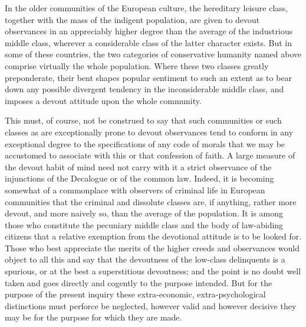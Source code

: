 \documentclass[12pt]{report}
\begin{document}
In the older communities of the European culture, the hereditary leisure
class, together with the mass of the indigent population, are given to
devout observances in an appreciably higher degree than the average
of the industrious middle class, wherever a considerable class of
the latter character exists. But in some of these countries, the two
categories of conservative humanity named above comprise virtually the
whole population. Where these two classes greatly preponderate, their
bent shapes popular sentiment to such an extent as to bear down any
possible divergent tendency in the inconsiderable middle class, and
imposes a devout attitude upon the whole community.

This must, of course, not be construed to say that such communities or
such classes as are exceptionally prone to devout observances tend to
conform in any exceptional degree to the specifications of any code
of morals that we may be accustomed to associate with this or that
confession of faith. A large measure of the devout habit of mind
need not carry with it a strict observance of the injunctions of the
Decalogue or of the common law. Indeed, it is becoming somewhat of a
commonplace with observers of criminal life in European communities that
the criminal and dissolute classes are, if anything, rather more devout,
and more naively so, than the average of the population. It is among
those who constitute the pecuniary middle class and the body of
law-abiding citizens that a relative exemption from the devotional
attitude is to be looked for. Those who best appreciate the merits of
the higher creeds and observances would object to all this and say that
the devoutness of the low-class delinquents is a spurious, or at the
best a superstitious devoutness; and the point is no doubt well taken
and goes directly and cogently to the purpose intended. But for the
purpose of the present inquiry these extra-economic, extra-psychological
distinctions must perforce be neglected, however valid and however
decisive they may be for the purpose for which they are made.
\end{document}
